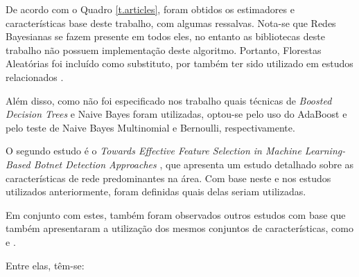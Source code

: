 De acordo com o Quadro \ref{t.articles}, foram obtidos os estimadores e características base deste trabalho, com algumas ressalvas. Nota-se que Redes Bayesianas se fazem presente em todos eles, no entanto as bibliotecas deste trabalho não possuem implementação deste algoritmo. Portanto, Florestas Aleatórias foi incluído como substituto, por também ter sido utilizado em estudos relacionados \cite{rna2}. 

Além disso, como não foi especificado nos trabalho quais técnicas de \textit{Boosted Decision Trees} e Naive Bayes foram utilizadas, optou-se pelo uso do AdaBoost e pelo teste de Naive Bayes Multinomial e Bernoulli, respectivamente.

O segundo estudo é o \textit{Towards Effective Feature Selection in Machine Learning-Based Botnet Detection Approaches} \cite{beigi2014towards}, que apresenta um estudo detalhado sobre as características de rede predominantes na área. Com base neste e nos estudos utilizados anteriormente, foram definidas quais delas seriam utilizadas. 

Em conjunto com estes, também foram observados outros estudos com base que também apresentaram a utilização dos mesmos conjuntos de características, como \cite{featureselection} e \cite{iscx1}.

Entre elas, têm-se:

